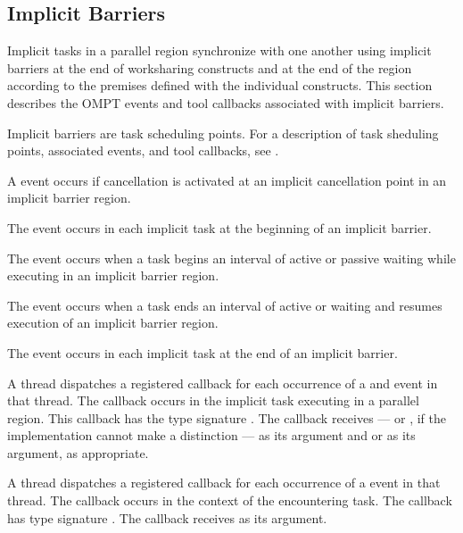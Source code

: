 \subsection{Implicit Barriers}
\label{subsec:implict-barrier}

Implicit tasks in a parallel region synchronize with one another using
implicit barriers at the end of worksharing constructs and at the end
of the  region according to the premises defined with
the individual constructs. This section describes the OMPT events and
tool callbacks associated with implicit barriers.

Implicit barriers are task scheduling points. For a description of
task sheduling points, associated events, and tool callbacks, see
.

\events

A  event occurs if cancellation is activated at an
implicit cancellation point in an implicit barrier region.

The  event occurs in each implicit task
at the beginning of an implicit barrier.

The  event occurs when a task begins an interval of
active or passive waiting while executing in an implicit barrier region.

The  event occurs when a task ends an interval of
active or waiting and resumes execution of an implicit barrier region.

The  event occurs in each implicit task
at the end of an implicit barrier.

\tools

A thread dispatches a registered 
callback for each occurrence of a  and
 event in that thread.  The callback occurs
in the implicit task executing in a parallel region.
This callback has the type signature
.  The callback receives
 --- or
, if the implementation cannot make a
distinction --- as its  argument and
 or  as its
 argument, as appropriate.

A thread dispatches a registered 
callback for each occurrence of a  event in that thread.
The callback occurs in the context of the encountering task.  The
callback has type signature .  The
callback receives  as its 
argument.

